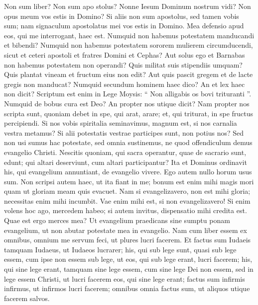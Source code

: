 \begin{biblechapter}
\begin{biblechapter}
\begin{biblechapter}
\begin{biblechapter}
\begin{biblechapter}
\begin{biblechapter}
\begin{biblechapter}
\begin{biblechapter}
\begin{biblechapter}
\verse Non sum liber? Non sum apo stolus? Nonne Iesum Dominum nostrum vidi? Non opus meum vos estis in Domino? 
\verse Si aliis non sum apostolus, sed tamen vobis sum; nam signaculum apostolatus mei vos estis in Domino. 
\verse Mea defensio apud eos, qui me interrogant, haec est. 
\verse Numquid non habemus potestatem manducandi et bibendi? 
\verse Numquid non habemus potestatem sororem mulierem circumducendi, sicut et ceteri apostoli et fratres Domini et Cephas? 
\verse Aut solus ego et Barnabas non habemus potestatem non operandi?
 \verse Quis militat suis stipendiis umquam? Quis plantat vineam et fructum eius non edit? Aut quis pascit gregem et de lacte gregis non manducat? 
\verse Numquid secundum hominem haec dico? An et lex haec non dicit? 
\verse Scriptum est enim in Lege Moysis: “ Non alligabis os bovi trituranti ”. Numquid de bobus cura est Deo? 
\verse An propter nos utique dicit? Nam propter nos scripta sunt, quoniam debet in spe, qui arat, arare; et, qui triturat, in spe fructus percipiendi. 
 \verse Si nos vobis spiritalia seminavimus, magnum est, si nos carnalia vestra metamus? 
\verse Si alii potestatis vestrae participes sunt, non potius nos? Sed non usi sumus hac potestate, sed omnia sustinemus, ne quod offendiculum demus evangelio Christi. 
\verse Nescitis quoniam, qui sacra operantur, quae de sacrario sunt, edunt; qui altari deserviunt, cum altari participantur? 
\verse Ita et Dominus ordinavit his, qui evangelium annuntiant, de evangelio vivere.
 \verse Ego autem nullo horum usus sum. Non scripsi autem haec, ut ita fiant in me; bonum est enim mihi magis mori quam ut gloriam meam quis evacuet. 
\verse Nam si evangelizavero, non est mihi gloria; necessitas enim mihi incumbit. Vae enim mihi est, si non evangelizavero! 
\verse Si enim volens hoc ago, mercedem habeo; si autem invitus, dispensatio mihi credita est. 
\verse Quae est ergo merces mea? Ut evangelium praedicans sine sumptu ponam evangelium, ut non abutar potestate mea in evangelio.
 \verse Nam cum liber essem ex omnibus, omnium me servum feci, ut plures lucri facerem. 
\verse Et factus sum Iudaeis tamquam Iudaeus, ut Iudaeos lucrarer; his, qui sub lege sunt, quasi sub lege essem, cum ipse non essem sub lege, ut eos, qui sub lege erant, lucri facerem; 
\verse his, qui sine lege erant, tamquam sine lege essem, cum sine lege Dei non essem, sed in lege essem Christi, ut lucri facerem eos, qui sine lege erant; 
\verse factus sum infirmis infirmus, ut infirmos lucri facerem; omnibus omnia factus sum, ut aliquos utique facerem salvos. 

\end{biblechapter}
\end{biblechapter}
\end{biblechapter}
\end{biblechapter}
\end{biblechapter}
\end{biblechapter}
\end{biblechapter}
\end{biblechapter}
\end{biblechapter}
